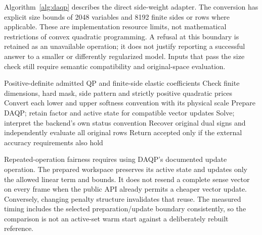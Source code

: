 Algorithm~\ref{alg:daqp} describes the direct side-weight adapter. The conversion
has explicit size bounds of 2048 variables and 8192 finite sides or rows where
applicable. These are implementation resource limits, not mathematical
restrictions of convex quadratic programming. A refusal at this boundary is
retained as an unavailable operation; it does not justify reporting a successful
answer to a smaller or differently regularized model. Inputs that pass the size
check still require semantic compatibility and original-space evaluation.

\begin{algorithm}[htbp]
\caption{Map compatible side-specific elastic prices into DAQP, retain its active workspace for allowed vector updates and recover original-space objective and multipliers.}\label{alg:daqp}
\begin{algorithmic}[1]
\Require Positive-definite admitted QP and finite-side elastic coefficients
\State Check finite dimensions, hard mask, side pattern and strictly positive quadratic prices
\State Convert each lower and upper softness convention with its physical scale
\State Prepare DAQP; retain factor and active state for compatible vector updates
\State Solve; interpret the backend's own status convention
\State Recover original dual signs and independently evaluate all original rows
\State Return accepted only if the external accuracy requirements also hold
\end{algorithmic}
\end{algorithm}

Repeated-operation fairness requires using DAQP's documented update operation.
The prepared workspace preserves its active state and updates only the allowed
linear term and bounds. It does not resend a complete sense vector on every
frame when the public API already permits a cheaper vector update. Conversely,
changing penalty structure invalidates that reuse. The measured timing includes
the selected preparation/update boundary consistently, so the comparison is not
an active-set warm start against a deliberately rebuilt reference.

